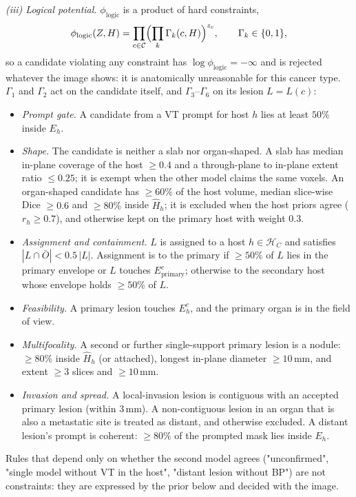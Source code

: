 \documentclass[fleqn,10pt]{olplainarticle}
\begin{document}
\textit{(iii) Logical potential.} $\phi_{\mathrm{logic}}$ is a product of hard constraints,
\begin{equation}
\label{eq:logic}
\phi_{\mathrm{logic}}(Z,H)=\prod_{c\in\mathcal{C}}\Bigl(\prod_{k}\Gamma_k(c,H)\Bigr)^{z_c},\qquad\Gamma_k\in\{0,1\},
\end{equation}
so a candidate violating any constraint has $\log\phi_{\mathrm{logic}}=-\infty$ and is rejected whatever the image shows:
it is anatomically unreasonable for this cancer type. $\Gamma_1$ and $\Gamma_2$ act on the candidate itself, and
$\Gamma_3$--$\Gamma_6$ on its lesion $L=L(c)$:
\begin{itemize}
\item[$\Gamma_1$] \emph{Prompt gate.} A candidate from a VT prompt for host $h$ lies at least $50\%$ inside $E_h$.
\item[$\Gamma_2$] \emph{Shape.} The candidate is neither a slab nor organ-shaped. A slab has median in-plane coverage of the
host $\ge0.4$ and a through-plane to in-plane extent ratio $\le0.25$; it is exempt when the other model claims the same
voxels. An organ-shaped candidate has $\ge60\%$ of the host volume, median slice-wise Dice $\ge0.6$ and $\ge80\%$ inside
$\hat H_h$; it is excluded when the host priors agree ($r_h\ge0.7$), and otherwise kept on the primary host with weight
$0.3$.
\item[$\Gamma_3$] \emph{Assignment and containment.} $L$ is assigned to a host $h\in\mathcal{H}_C$ and satisfies
$|L\cap\bar O|<0.5\,|L|$. Assignment is to the primary if $\ge50\%$ of $L$ lies in the primary envelope or $L$ touches
$E^{c}_{\text{primary}}$; otherwise to the secondary host whose envelope holds $\ge50\%$ of $L$.
\item[$\Gamma_4$] \emph{Feasibility.} A primary lesion touches $E^{c}_h$, and the primary organ is in the field of view.
\item[$\Gamma_5$] \emph{Multifocality.} A second or further single-support primary lesion is a nodule: $\ge80\%$ inside
$\hat H_h$ (or attached), longest in-plane diameter $\ge10$\,mm, and extent $\ge3$ slices and $\ge10$\,mm.
\item[$\Gamma_6$] \emph{Invasion and spread.} A local-invasion lesion is contiguous with an accepted primary lesion
(within $3$\,mm). A non-contiguous lesion in an organ that is also a metastatic site is treated as distant, and otherwise
excluded. A distant lesion's prompt is coherent: $\ge80\%$ of the prompted mask lies inside $E_h$.
\end{itemize}
Rules that depend only on whether the second model agrees ("unconfirmed", "single model without VT in the host", "distant
lesion without BP") are not constraints: they are expressed by the prior below and decided with the image.
\end{document}
